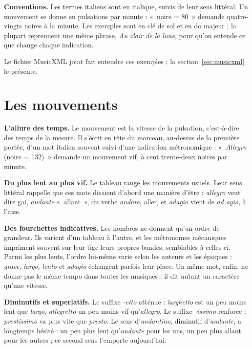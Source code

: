 \documentclass[a4paper,11pt]{article}
\newcommand{\tableau}[1]{%
  \par\medskip
  {\centering\small\par}
  \medskip
}
\begin{document}
\begin{remarque}
\textbf{Conventions.} Les termes italiens sont en italique, suivis de leur sens
littéral. Un mouvement se donne en pulsations par minute : «~noire = 80~»
demande quatre-vingts noires à la minute. Les exemples sont en clé de sol et en
do majeur ; la plupart reprennent une même phrase, \emph{Au clair de la lune},
pour qu'on entende ce que change chaque indication.
\end{remarque}

Le fichier MusicXML joint fait entendre ces exemples ; la
section~\ref{sec:musicxml} le présente.

\section{Les mouvements}
\label{sec:mouvements}

\textbf{L'allure des temps.} Le mouvement est la vitesse de la pulsation,
c'est-à-dire des temps de la mesure. Il s'écrit en tête du morceau, au-dessus
de la première portée, d'un mot italien souvent suivi d'une indication
métronomique : «~\emph{Allegro} (noire = 132)~» demande un mouvement vif, à
cent trente-deux noires par minute.

\textbf{Du plus lent au plus vif.} Le tableau range les mouvements usuels. Leur
sens littéral rappelle que ces mots disaient d'abord une manière d'être :
\emph{allegro} veut dire gai, \emph{andante} «~allant~», du verbe \emph{andare},
aller, et \emph{adagio} vient de \emph{ad agio}, à l'aise.

\tableau{mouvements}

\begin{remarque}
\textbf{Des fourchettes indicatives.} Les nombres ne donnent qu'un ordre de
grandeur. Ils varient d'un tableau à l'autre, et les métronomes mécaniques
impriment souvent sur leur tige leurs propres bandes, semblables à celles-ci.
Parmi les plus lents, l'ordre lui-même varie selon les auteurs et les époques :
\emph{grave}, \emph{largo}, \emph{lento} et \emph{adagio} échangent parfois
leur place. Un même mot, enfin, ne donne pas le même tempo dans toutes les
musiques : il dit autant un caractère qu'une vitesse.
\end{remarque}

\textbf{Diminutifs et superlatifs.} Le suffixe \emph{-etto} atténue :
\emph{larghetto} est un peu moins lent que \emph{largo}, \emph{allegretto} un
peu moins vif qu'\emph{allegro}. Le suffixe \emph{-issimo} renforce :
\emph{prestissimo} va plus vite que \emph{presto}. Le sens
d'\emph{andantino}, diminutif d'\emph{andante}, a longtemps hésité : un peu
plus lent qu'\emph{andante} pour les uns, un peu plus allant pour les autres ;
ce second sens l'emporte aujourd'hui.
\end{document}
